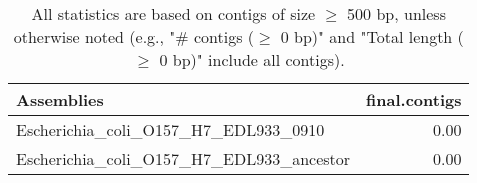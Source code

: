\documentclass[12pt,a4paper]{article}
\begin{document}
\begin{table}[ht]
\begin{center}
\caption{All statistics are based on contigs of size $\geq$ 500 bp, unless otherwise noted (e.g., "\# contigs ($\geq$ 0 bp)" and "Total length ($\geq$ 0 bp)" include all contigs).}
\begin{tabular}{|l*{1}{|r}|}
\hline
Assemblies & final.contigs \\ \hline
Escherichia\_coli\_O157\_H7\_EDL933\_0910 & 0.00 \\ \hline
Escherichia\_coli\_O157\_H7\_EDL933\_ancestor & 0.00 \\ \hline
\end{tabular}
\end{center}
\end{table}
\end{document}
